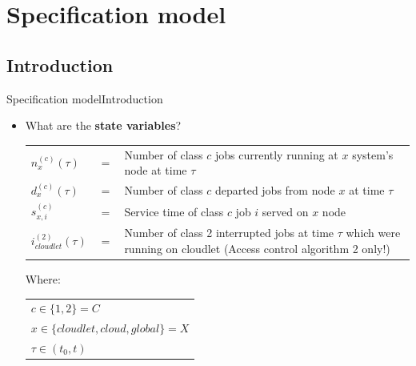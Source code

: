 \documentclass[10pt]{beamer}
\begin{document}
\section{Specification model}
\subsection{Introduction}

\begin{frame}{Specification model}{Introduction}


\begin{itemize}
\item What are the \textbf{state variables}?

\begin{table}[h!]
    \centering
    \small
    \begin{tabular}{p{1cm}p{0.5cm}p{8cm}}
       
      $n_x^{(c)}(\tau)$ & $ = $ & Number of class $c$ jobs currently running at $x$ system's node at time $\tau$ \\
      $d_x^{(c)}(\tau)$ & $ = $ & Number of class $c$ departed jobs from node $x$ at time $\tau$ \\
      $s_{x,i}^{(c)}$ & $ = $ & Service time of class $c$ job $i$ served on $x$ node   \\
      $i_{cloudlet}^{(2)}(\tau)$ & $ = $ & Number of class 2 interrupted jobs at time $\tau$ which were running on cloudlet (Access control algorithm 2 only!)\\
          
    \end{tabular}
\end{table}

Where:

\begin{table}[h!]
    \centering
    \small
    \begin{tabular}{l}
      $c \in \lbrace 1,2 \rbrace = C$ \\
      $x \in \lbrace cloudlet,cloud,global \rbrace = X$ \\
      $\tau \in (t_0, t)$ \\       
    \end{tabular}
\end{table}

\end{itemize}
\end{frame}
\end{document}
